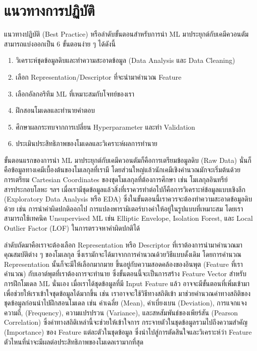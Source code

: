 \section{แนวทางการปฏิบัติ}
\label{sec:pred_best_prac}

แนวทางปฏิบัติ (Best Practice) หรือลำดับขั้นตอนสำหรับการนำ ML มาประยุกต์กับเคมีควอนตัมสามารถแบ่งออกเป็น 6 ขั้นตอนง่าย ๆ ได้ดังนี้

\begin{enumerate}
    \item วิเคราะห์ชุดข้อมูลดิบและทำความสะอาดข้อมูล (Data Analysis และ Data Cleaning)
    
    \item เลือก Representation/Descriptor ที่จะนำมาคำนวณ Feature 
    
    \item เลือกอัลกอริทึม ML ที่เหมาะสมกับโจทย์ของเรา 
    
    \item ฝึกสอนโมเดลและทำนายคำตอบ
    
    \item ศึกษาผลกระทบจากการเปลี่ยน Hyperparameter และทำ Validation
    
    \item ประเมินประสิทธิภาพของโมเดลและวิเคราะห์ผลการทำนาย
\end{enumerate}

ขั้นตอนแรกของการนำ ML มาประยุกต์กับเคมีควอนตัมก็คือการเตรียมข้อมูลดิบ (Raw Data) นั่นก็คือข้อมูลทางเคมีเบื้องต้นของโมเลกุลที่เรามี 
โดยส่วนใหญ่แล้วนักเคมีเชิงคำนวณมักจะเริ่มต้นด้วยการเตรียม Cartesian Coordinates ของชุดโมเลกุลที่ต้องการศึกษา เช่น โมเลกุลอินทรีย์
สารประกอบโลหะ ฯลฯ เมื่อเรามีชุดข้อมูลแล้วสิ่งที่เราควรทำต่อไปก็คือการวิเคราะห์ข้อมูลแบบเชิงลึก (Exploratory Data Analysis หรือ EDA) 
ซึ่งในขั้นตอนนี้เราควรจะต้องทำความสะอาดข้อมูลดิบด้วย เช่น การนำค่าผิดปกติออกไป การแปลงพารามิเตอร์บางค่าให้อยู่ในรูปแบบที่เหมาะสม 
โดยเราสามารถใช้เทคนิค Unsupervised ML เช่น Elliptic Envelope, Isolation Forest, และ Local Outlier Factor (LOF)
ในการตรวจหาค่าผิดปกติได้

ลำดับถัดมาคือเราจะต้องเลือก Representation หรือ Descriptor ที่เราต้องการนำมาคำนวณมาคุณสมบัติต่าง ๆ ของโมเลกุล 
ซึ่งเรามักจะได้มาจากการคำนวณด้วยวิธีแบบดั้งเดิม โดยการคำนวณ Representation นั้นก็จะมีให้เลือกมากมาย ขึ้นอยู่กับความสอดคล้องของอินพุต 
(Feature ที่เราคำนวณ) กับเอาต์พุตที่เราต้องการจะทำนาย ซึ่งขั้นตอนนี้จะเป็นการสร้าง Feature Vector สำหรับการฝึกโมเดล ML นั่นเอง 
เมื่อเราได้ชุดข้อมูลที่มี Input Feature แล้ว อาจจะมีขั้นตอนที่เพิ่มเข้ามาเพื่อช่วยให้เราเข้าใจชุดข้อมูลได้มากขึ้น เช่น เราอาจจะใช้วิธีทางสถิติเข้า%
มาช่วยคำนวณค่าทางสถิติของชุดข้อมูลก่อนนำไปฝึกสอนโมเดล เช่น ค่าเฉลี่ย (Mean), ค่าเบี่ยงเบน (Deviation), การแจกแจงความถี่, 
(Frequency), ความแปรปรวน (Variance), และสหสัมพันธ์ของเพียร์สัน (Pearson Correlation) ซึ่งค่าทางสถิติเหล่านี้จะช่วยให้เข้าใจการ%
กระจายตัวในชุดข้อมูลรวมไปถึงความสำคัญ (Importance) ของ Feature แต่ละตัวในชุดข้อมูล ซึ่งนำไปสู่การตัดสินใจและวิเคราะห์ว่า Feature 
ตัวไหนที่น่าจะมีผลต่อประสิทธิภาพของโมเดลเรามากที่สุด 

